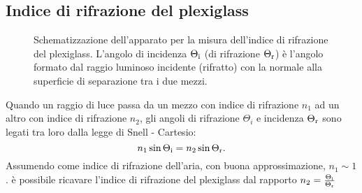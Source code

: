 \documentclass{article}[a4paper,11pt]
\begin{document}
\subsection*{Indice di rifrazione del plexiglass}
\begin{figure}[!htb]
 \centering
 \caption{Schematizzazione dell'apparato per la misura dell'indice di
    rifrazione del plexiglass.
    L'angolo di incidenza $\Theta_{\rm i}$ (di rifrazione $\Theta_{\rm r}$)
    \`e l'angolo formato dal raggio luminoso incidente (rifratto) con la
    normale alla superficie di separazione tra i due mezzi.}
 \label{fig:plexiglass}
\end{figure}
\noindent
Quando un raggio di luce passa da un mezzo con indice di rifrazione $n_1$ ad un altro con indice di rifrazione $n_2$, gli angoli di rifrazione $\Theta_i$ e incidenza $\Theta_{\rm r}$ sono legati tra loro dalla legge di Snell - Cartesio:
\begin{equation}\label{eq:Snell}
  n_1 \sin\Theta_{\rm i} = n_2\sin\Theta_{\rm r}.
\end{equation}
Assumendo come indice di rifrazione dell'aria, con buona approssimazione, $n_1 \sim 1$.
è possibile ricavare l'indice di rifrazione del plexiglass dal rapporto $n_2 = \frac{\Theta_{\rm i}}{\Theta_{\rm r}}$
\end{document}
